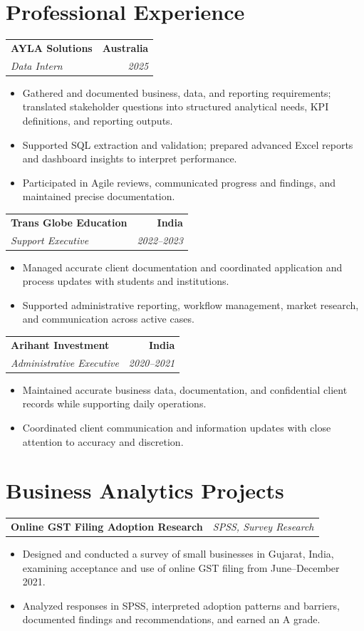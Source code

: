 \documentclass[letterpaper,10pt]{article}
\makeatletter
\newcommand{\role}[4]{%
  \begin{tabularx}{\textwidth}{@{}Xr@{}}
    \textbf{#1} & \textbf{#2} \\
    \textit{#3} & \textit{#4}
  \end{tabularx}\vspace{-1pt}
}
\newcommand{\project}[2]{%
  \begin{tabularx}{\textwidth}{@{}Xr@{}}
    \textbf{#1} & \textit{#2}
  \end{tabularx}\vspace{-1pt}
}
\makeatother
\begin{document}
\section{Professional Experience}
\role{AYLA Solutions}{Australia}{Data Intern}{2025}
\begin{itemize}
  \item Gathered and documented business, data, and reporting requirements; translated stakeholder questions into structured analytical needs, KPI definitions, and reporting outputs.
  \item Supported SQL extraction and validation; prepared advanced Excel reports and dashboard insights to interpret performance.
  \item Participated in Agile reviews, communicated progress and findings, and maintained precise documentation.
\end{itemize}
\vspace{1pt}

\role{Trans Globe Education}{India}{Support Executive}{2022--2023}
\begin{itemize}
  \item Managed accurate client documentation and coordinated application and process updates with students and institutions.
  \item Supported administrative reporting, workflow management, market research, and communication across active cases.
\end{itemize}
\vspace{1pt}

\role{Arihant Investment}{India}{Administrative Executive}{2020--2021}
\begin{itemize}
  \item Maintained accurate business data, documentation, and confidential client records while supporting daily operations.
  \item Coordinated client communication and information updates with close attention to accuracy and discretion.
\end{itemize}

\section{Business Analytics Projects}
\project{Online GST Filing Adoption Research}{SPSS, Survey Research}
\begin{itemize}
  \item Designed and conducted a survey of small businesses in Gujarat, India, examining acceptance and use of online GST filing from June--December 2021.
  \item Analyzed responses in SPSS, interpreted adoption patterns and barriers, documented findings and recommendations, and earned an A grade.
\end{itemize}
\vspace{1pt}
\end{document}
